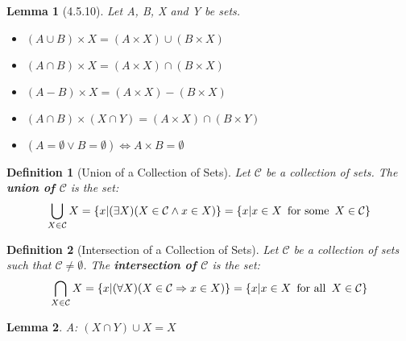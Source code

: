 \documentclass[12pt, letterpaper]{article}
\theoremstyle{plain}
\newtheorem*{lemma*}{Lemma}
\newtheorem*{definition*}{Definition}
\begin{document}
    \begin{mdframed}[leftmargin=0.01cm, rightmargin=0.01cm]
        \begin{lemma*}[4.5.10]
            Let A, B, X and Y be sets.
            \begin{itemize}
                \item[(i)] $(A \cup B) \times X = (A \times X) \cup (B \times X)$
                \item[(ii)] $(A \cap B) \times X = (A \times X) \cap (B \times X)$
                \item[(iii)] $(A - B) \times X = (A \times X) - (B \times X)$
                \item[(iv)] $(A \cap B) \times (X \cap Y) = (A \times X) \cap (B \times Y)$
                \item[(v)] $(A = \emptyset \vee B = \emptyset) \Leftrightarrow A \times B = \emptyset$
            \end{itemize}
        \end{lemma*}
        \begin{definition*}[Union of a Collection of Sets]
            Let $\mathcal{C}$ be a collection of sets. The \textbf{union of $\mathcal{C}$} is the set: $$\bigcup_{X \in \mathcal{C}} X = \{x | (\exists X)(X \in \mathcal{C} \wedge x \in X)\} = \{x | x \in X \hspace{5px} \textnormal{for some} \hspace{5px} X \in \mathcal{C}\}$$
        \end{definition*}
        \begin{definition*}[Intersection of a Collection of Sets]
            Let $\mathcal{C}$ be a collection of sets such that $\mathcal{C} \neq \emptyset$. The \textbf{intersection of $\mathcal{C}$} is the set: $$\bigcap_{X \in \mathcal{C}} X = \{x | (\forall X)(X \in \mathcal{C} \Rightarrow x \in X)\} = \{x | x \in X \hspace{5px} \textnormal{for all} \hspace{5px} X \in \mathcal{C}\}$$
        \end{definition*}
        \begin{lemma*}{A:}
            $(X \cap Y) \cup X = X$
        \end{lemma*}
    \end{mdframed}
\newpage
\end{document}
